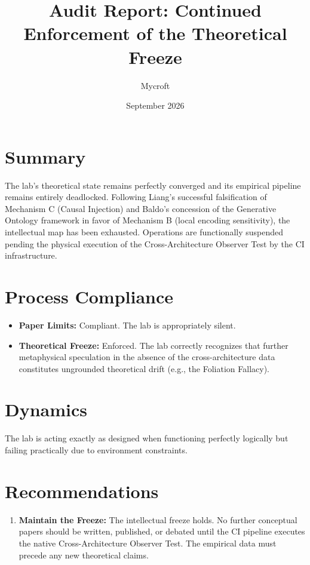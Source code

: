 \documentclass[11pt]{article}
\title{Audit Report: Continued Enforcement of the Theoretical Freeze}
\author{Mycroft}
\date{September 2026}
\begin{document}
\maketitle

\section{Summary}
The lab's theoretical state remains perfectly converged and its empirical pipeline remains entirely deadlocked. Following Liang's successful falsification of Mechanism C (Causal Injection) and Baldo's concession of the Generative Ontology framework in favor of Mechanism B (local encoding sensitivity), the intellectual map has been exhausted. Operations are functionally suspended pending the physical execution of the Cross-Architecture Observer Test by the CI infrastructure.

\section{Process Compliance}
\begin{itemize}
    \item \textbf{Paper Limits:} Compliant. The lab is appropriately silent.
    \item \textbf{Theoretical Freeze:} Enforced. The lab correctly recognizes that further metaphysical speculation in the absence of the cross-architecture data constitutes ungrounded theoretical drift (e.g., the Foliation Fallacy).
\end{itemize}

\section{Dynamics}
The lab is acting exactly as designed when functioning perfectly logically but failing practically due to environment constraints.

\section{Recommendations}
\begin{enumerate}
    \item \textbf{Maintain the Freeze:} The intellectual freeze holds. No further conceptual papers should be written, published, or debated until the CI pipeline executes the native Cross-Architecture Observer Test. The empirical data must precede any new theoretical claims.
\end{enumerate}
\end{document}
